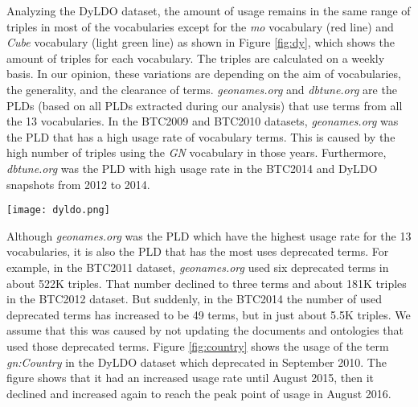 Analyzing the DyLDO dataset, the amount of usage remains in the same range of triples in most of the vocabularies except for the \textit{mo} vocabulary (red line) and \textit{Cube} vocabulary (light green line) as shown in Figure \ref{fig:dy}, which shows the amount of triples for each vocabulary. The triples are calculated on a weekly basis. In our opinion, these variations are depending on the aim of vocabularies, the generality, and the clearance of terms.  
%
\textit{geonames.org} and \textit{dbtune.org} are the PLDs (based on all PLDs extracted during our analysis) that use terms from all the 13 vocabularies. 
In the BTC2009 and BTC2010 datasets, \textit{geonames.org} was the PLD that has a high usage rate of vocabulary terms. This is caused by the high number of triples using the \textit{GN} vocabulary in those years. Furthermore, \textit{dbtune.org} was the PLD with high usage rate in the BTC2014 and DyLDO snapshots from 2012 to 2014. 

\begin{figure*}
	\centering
	\texttt{[image: dyldo.png]}
	\caption{Amount of triples that had terms from the 13 vocabularies, in the DyLDO datasets. The X-axis represents the dates of DyLDO snapshots and Y-axis represents the total number of triples that use the terms of certain vocabularies.}
	\label{fig:dy}
\end{figure*}

Although \textit{geonames.org} was the PLD which have the highest usage rate for the 13 vocabularies, it is also the PLD that has the most uses deprecated terms. For example, in the BTC2011 dataset, \textit{geonames.org} used six deprecated terms in about 522K triples. That number declined to three terms and about 181K triples in the BTC2012 dataset. But suddenly, in the BTC2014 the number of used deprecated terms has increased to be 49 terms, but in just about 5.5K triples. We assume that this was caused by not updating the documents and ontologies that used those deprecated terms. Figure \ref{fig:country} shows the usage of the term \textit{gn:Country} in the DyLDO dataset which deprecated in September 2010. The figure shows that it had an increased usage rate until August 2015, then it declined and increased again to reach the peak point of usage in August 2016.

